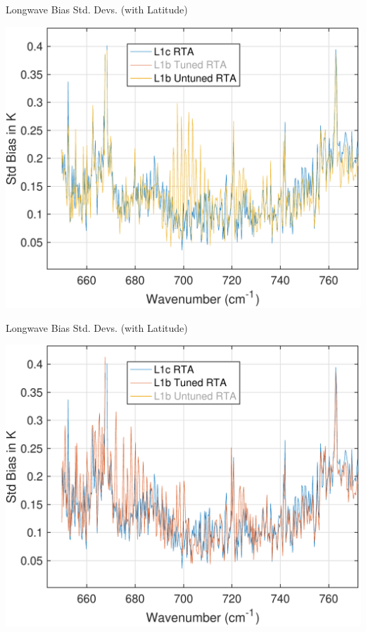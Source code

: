 \documentclass[10pt,t]{beamer}
\begin{document}
\begin{frame}[label={sec:org0f46d77}]{Longwave Bias Std. Devs. (with Latitude)}
\addtocounter{framenumber}{-1}
  \begin{center}
\includegraphics[width=0.75\linewidth]{./Talk2/std_3rta_lw_noL1btuning.pdf}
\end{center}
\end{frame}

\begin{frame}[label={sec:orga29dad3}]{Longwave Bias Std. Devs. (with Latitude)}
\addtocounter{framenumber}{-1}
  \begin{center}
\includegraphics[width=0.75\linewidth]{./Talk2/std_3rta_lw_nol1b_untuned.pdf}
\end{center}
\end{frame}
\end{document}
